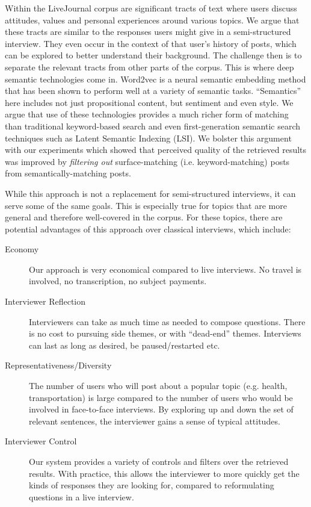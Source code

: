 \documentclass{sigchi}
\begin{document}
Within the LiveJournal corpus are significant tracts of text where users discuss attitudes, values
and personal experiences around various topics. We argue that these tracts are similar to the
responses users might give in a semi-structured interview. They even occur in the context of that
user's history of posts, which can be explored to better understand their background. The challenge
then is to separate the relevant tracts from other parts of the corpus. This is where deep semantic
technologies come in. Word2vec is a neural semantic embedding method that has been shown to perform
well at a variety of semantic tasks. ``Semantics'' here includes not just propositional content,
but sentiment and even style. We argue that use of these technologies provides a much richer form
of matching than traditional keyword-based search and even first-generation semantic search
techniques such as Latent Semantic Indexing (LSI). We bolster this argument with our experiments
which showed that perceived quality of the retrieved results was improved by {\em filtering out}
surface-matching (i.e. keyword-matching) posts from semantically-matching posts.

While this approach is not a replacement for semi-structured interviews, it can serve some of the
same goals. This is especially true for topics that are more general and therefore well-covered in
the corpus. For these topics, there are potential advantages of this approach over classical
interviews, which include:

\begin{description}
\item[Economy] Our approach is very economical compared to live interviews. No travel is involved,
  no transcription, no subject payments.
\item[Interviewer Reflection] Interviewers can take as much time as needed to compose questions.
  There is no cost to pursuing side themes, or with ``dead-end'' themes. Interviews can last as long
  as desired, be paused/restarted etc. 
\item[Representativeness/Diversity] The number of users who will post about a popular topic (e.g. health,
  transportation) is large compared to the number of users who would be involved in face-to-face
  interviews. By exploring up and down the set of relevant sentences, the interviewer gains a
  sense of typical attitudes.
\item[Interviewer Control] Our system provides a variety of controls and filters over the retrieved
  results. With practice, this allows the interviewer to more quickly get the kinds of responses
  they are looking for, compared to reformulating questions in a live interview. 
\end{description}
\end{document}
